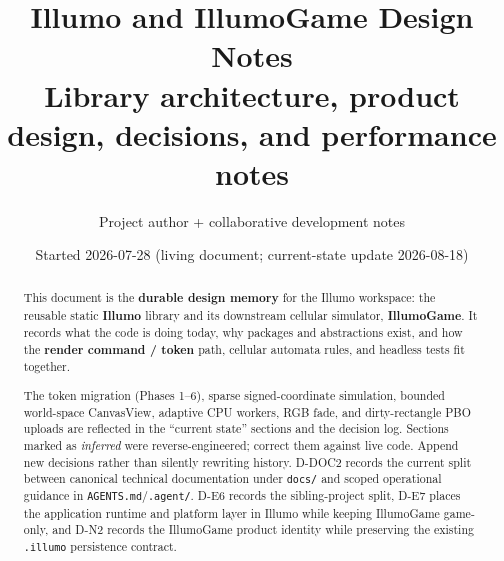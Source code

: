 \documentclass[11pt,a4paper]{article}
\title{%
  Illumo and IllumoGame Design Notes\\
  \large Library architecture, product design, decisions, and performance notes%
}
\author{Project author + collaborative development notes}
\date{Started 2026-07-28 \quad (living document; current-state update 2026-08-18)}
\newcommand{\pathref}[1]{\texttt{#1}}
\begin{document}
\maketitle

\begin{abstract}
This document is the \textbf{durable design memory} for the Illumo workspace:
the reusable static \textbf{Illumo} library and its downstream cellular
simulator, \textbf{IllumoGame}. It records what the code is doing today, why
packages and abstractions exist, and how the \textbf{render command / token}
path, cellular automata rules, and headless tests fit together.

The token migration (Phases 1--6), sparse signed-coordinate simulation,
bounded world-space CanvasView, adaptive CPU workers, RGB fade, and
dirty-rectangle PBO uploads are reflected
in the ``current state'' sections and the decision log. Sections marked as
\emph{inferred} were reverse-engineered; correct them against live code. Append
new decisions rather than silently rewriting history. D-DOC2 records the
current split between canonical technical documentation under
\pathref{docs/} and scoped operational guidance in
\pathref{AGENTS.md}/\pathref{.agent/}. D-E6 records the sibling-project split,
D-E7 places the application runtime and platform layer in Illumo while keeping
IllumoGame game-only, and D-N2 records the IllumoGame product identity while
preserving the existing \texttt{.illumo} persistence contract.
\end{abstract}

\tableofcontents
\newpage














\appendix


\end{document}
